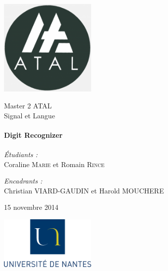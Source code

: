 
\begin{titlepage}
	\begin{center}

		\includegraphics[width=0.35\textwidth]{Figures/ATAL.png}~

		\LARGE{Master 2 \textsc{ATAL}}\\[1.5cm]

		\Large{Signal et Langue}\\[0.5cm]

		\HRule \\[0.4cm]
		{ \huge \bfseries Digit Recognizer \\[0.4cm] }
		\HRule \\[1.5cm]

		\normalsize		
		\emph{\'Etudiants :}\\
		Coraline \textsc{Marie} et Romain \textsc{Rince}

		\vspace{0.5cm}

		\emph{Encadrants :} \\
		Christian \textsc{VIARD-GAUDIN} et Harold \textsc{MOUCHERE}

		\vspace{1cm}

		{\large 15 novembre 2014}

		\vfill

		
		\includegraphics[width=0.35\textwidth]{Figures/logoUN.png}~\\[2cm]

		

	\end{center}
\end{titlepage}
